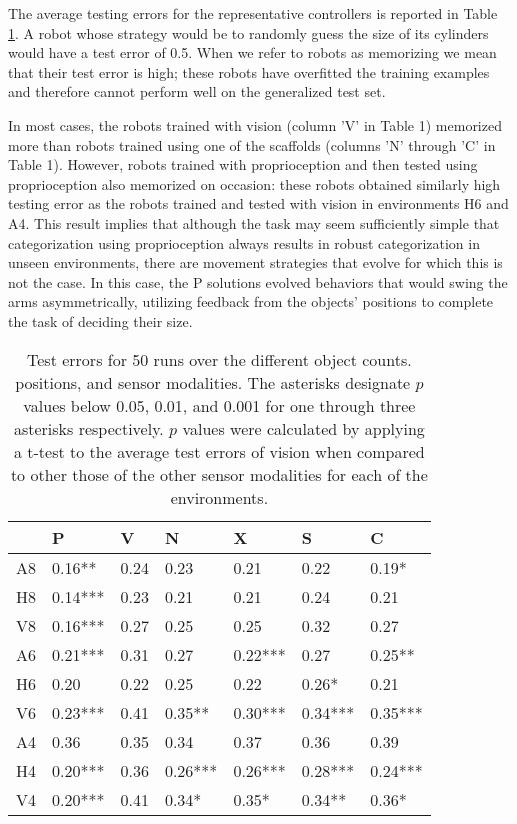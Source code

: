 \documentclass{sig-alternate}
\begin{document}
The average testing errors for the representative controllers is reported in Table \ref{table:summary}. A robot whose strategy would be to randomly guess the size of its cylinders would have a test error of 0.5. When we refer to robots as memorizing we mean that their test error is high; these robots have overfitted the training examples and therefore cannot perform well on the generalized test set.


In most cases, the robots trained with vision (column 'V' in Table 1)
memorized more than robots trained using one of the scaffolds (columns
'N' through 'C' in Table 1). However, robots trained with proprioception
and then tested using proprioception also memorized on occasion: these
robots obtained similarly high testing error as the robots trained and
tested with vision in environments H6 and A4.
This result implies that although the task may seem sufficiently simple
that categorization using proprioception always results in robust
categorization in unseen environments, there are movement strategies
that evolve for which this is not the case.
In this case, the P solutions evolved behaviors that would swing the arms asymmetrically, utilizing feedback from the objects' positions to complete the task of deciding their size. 

\setlength{\tabcolsep}{4pt}
\begin {table} [!t]
  \begin {tabular}{|c|l|l|l|l|l|l|} \hline
  & P          & V    & N       & X       & S       & C       \\ \hline
  A8 & 0.16**  & 0.24 & 0.23    & 0.21    & 0.22    & 0.19*   \\ \hline
  H8 & 0.14*** & 0.23 & 0.21    & 0.21    & 0.24    & 0.21    \\ \hline
  V8 & 0.16*** & 0.27 & 0.25    & 0.25    & 0.32    & 0.27    \\ \hline \hline
  A6 & 0.21*** & 0.31 & 0.27    & 0.22*** & 0.27    & 0.25**  \\ \hline
  H6 & 0.20    & 0.22 & 0.25    & 0.22    & 0.26*   & 0.21    \\ \hline
  V6 & 0.23*** & 0.41 & 0.35**  & 0.30*** & 0.34*** & 0.35*** \\ \hline \hline
  A4 & 0.36    & 0.35 & 0.34    & 0.37    & 0.36    & 0.39    \\ \hline
  H4 & 0.20*** & 0.36 & 0.26*** & 0.26*** & 0.28*** & 0.24*** \\ \hline
  V4 & 0.20*** & 0.41 & 0.34*   & 0.35*   & 0.34**  & 0.36*   \\ \hline
  \end {tabular}
  \caption{Test errors for 50 runs over the different object counts. positions, and sensor modalities. The asterisks designate $p$ values below 0.05, 0.01, and 0.001 for one through three asterisks respectively. $p$ values were calculated by applying a t-test to the average test errors of vision when compared to other those of the other sensor modalities for each of the environments.}
  \vspace{-0.3cm} 
\label {table:summary}
\end {table}
\end{document}
